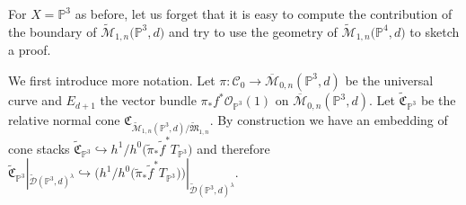 \documentclass[pdftex]{sigma}
\numberwithin{equation}{section}
\newcommand{\PP}{\mathbb P}
\theoremstyle{plain}
\theoremstyle{definition}
\theoremstyle{remark}
\begin{document}
\begin{Remark}For $X=\PP^3$ as before, let us forget that it is easy to compute the contribution of the boundary of $\widetilde{\mathcal{M}}_{1,n}\big(\PP^3,d\big)$ and try to use the geometry of $\widetilde{\mathcal{M}}_{1,n}\big(\PP^4,d\big)$ to sketch a proof.

We first introduce more notation. Let $\pi\colon \mathcal{C}_0\to \overline{\mathcal{M}}_{0,n}(\PP^3,d)$ be the universal curve and $E_{d+1}$ the vector bundle $\pi_*f^*\mathcal{O}_{\PP^3}(1)$ on $\overline{\mathcal{M}}_{0,n}(\PP^3,d)$. Let $\widetilde{\mathfrak{C}}_{\PP^3}$ be the relative normal cone $\mathfrak{C}_{\widetilde{\mathcal{M}}_{1,n}(\PP^3,d)/\widetilde{\mathfrak{M}}_{1,n}}$. By construction we have an embedding of cone stacks $\widetilde{\mathfrak{C}}_{\PP^3}\hookrightarrow h^1/h^0\big(\widetilde{\pi}_*\widetilde{f}^*T_{\PP^3}\big)$ and therefore $\widetilde{\mathfrak{C}}_{\PP^3}|_{\widetilde{\mathcal{D}}(\PP^3,d)^{\lambda}}\hookrightarrow \big(h^1/h^0(\widetilde{\pi}_*\widetilde{f}^*T_{\PP^3}\big)\big)|_{\widetilde{\mathcal{D}} (\PP^3,d)^{\lambda}}$.


\end{Remark}
\end{document}
